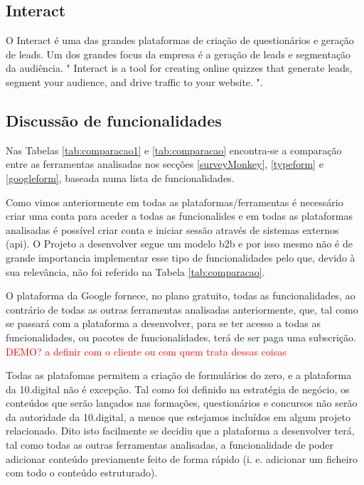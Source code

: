 \subsection{Interact}
\label{interactM}


O Interact é uma das grandes plataformas de criação de questionários e geração de leads. Um dos grandes focus da empresa é a geração de leads e segmentação da audiência. " Interact is a tool for creating online quizzes that generate leads, segment your audience, and drive traffic to your website. "\cite{interact}.


\subsection{Discussão de funcionalidades}
\label{comparacao}
























Nas Tabelas \ref{tab:comparacao1} e \ref{tab:comparacao} encontra-se a comparação entre as ferramentas analisadas nos secções \ref{surveyMonkey}, \ref{typeform} e \ref{googleform}, baseada numa lista de funcionalidades.

Como vimos anteriormente em todas as plataformas/ferramentas é necessário criar uma conta para aceder a todas as funcionalides e em todas as plataformas analisadas é possível criar conta e iniciar sessão através de sistemas externos (\acrshort{api}). O Projeto a desenvolver segue um modelo \gls{b2b} e por isso mesmo não é de grande importancia implementar esse tipo de funcionalidades pelo que, devido à sua relevância, não foi referido na Tabela \ref{tab:comparacao}.

O plataforma da Google fornece, no plano gratuito, todas as funcionalidades, ao contrário de todas as outras ferramentas analisadas anteriormente, que, tal como se passará com a plataforma a desenvolver, para se ter acesso a todas as funcionalidades, ou pacotes de funcionalidades, terá de ser paga uma subscrição. \textcolor{red}{DEMO? a definir com o cliente ou com quem trata dessas coisas}

Todas as platafomas permitem a criação de formulários do zero, e a plataforma da 10.digital não é excepção. Tal como foi definido na estratégia de negócio, os conteúdos que serão lançados nas formações, questionários e concursos não serão da autoridade da 10.digital, a menos que estejamos incluídos em algum projeto relacionado. Dito isto facilmente se decidiu que a plataforma a desenvolver terá, tal como todas as outras ferramentas analisadas, a funcionalidade de poder adicionar conteúdo previamente feito de forma rápido (i. e. adicionar um ficheiro com todo o conteúdo estruturado). 


